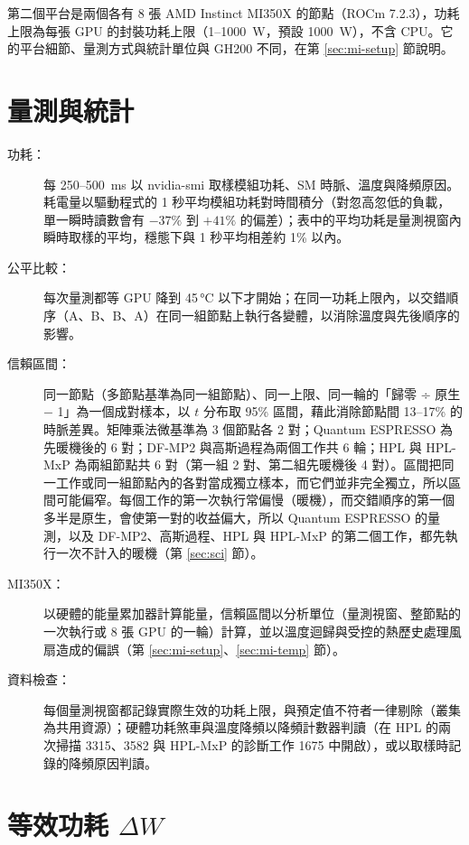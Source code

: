 第二個平台是兩個各有 8 張 AMD Instinct MI350X 的節點（ROCm 7.2.3），功耗上限為每張 GPU 的封裝功耗上限（1–1000~W，預設 1000~W），不含 CPU。它的平台細節、量測方式與統計單位與 GH200 不同，在第 \ref{sec:mi-setup} 節說明。

\section{量測與統計}\label{sec:measure}

\begin{description}
  \item[功耗：] 每 250–500~ms 以 nvidia-smi 取樣模組功耗、SM 時脈、溫度與降頻原因。耗電量以驅動程式的 1 秒平均模組功耗對時間積分（對忽高忽低的負載，單一瞬時讀數會有 $-37\%$ 到 $+41\%$ 的偏差）；表中的平均功耗是量測視窗內瞬時取樣的平均，穩態下與 1 秒平均相差約 1\% 以內。
  \item[公平比較：] 每次量測都等 GPU 降到 45\,°C 以下才開始；在同一功耗上限內，以交錯順序（A、B、B、A）在同一組節點上執行各變體，以消除溫度與先後順序的影響。
  \item[信賴區間：] 同一節點（多節點基準為同一組節點）、同一上限、同一輪的「歸零 ÷ 原生 $-$ 1」為一個成對樣本，以 $t$ 分布取 95\% 區間，藉此消除節點間 13–17\% 的時脈差異。矩陣乘法微基準為 3 個節點各 2 對；Quantum ESPRESSO 為先暖機後的 6 對；DF-MP2 與高斯過程為兩個工作共 6 輪；HPL 與 HPL-MxP 為兩組節點共 6 對（第一組 2 對、第二組先暖機後 4 對）。區間把同一工作或同一組節點內的各對當成獨立樣本，而它們並非完全獨立，所以區間可能偏窄。每個工作的第一次執行常偏慢（暖機），而交錯順序的第一個多半是原生，會使第一對的收益偏大，所以 Quantum ESPRESSO 的量測，以及 DF-MP2、高斯過程、HPL 與 HPL-MxP 的第二個工作，都先執行一次不計入的暖機（第 \ref{sec:sci} 節）。
  \item[MI350X：] 以硬體的能量累加器計算能量，信賴區間以分析單位（量測視窗、整節點的一次執行或 8 張 GPU 的一輪）計算，並以溫度迴歸與受控的熱歷史處理風扇造成的偏誤（第 \ref{sec:mi-setup}、\ref{sec:mi-temp} 節）。
  \item[資料檢查：] 每個量測視窗都記錄實際生效的功耗上限，與預定值不符者一律剔除（叢集為共用資源）；硬體功耗煞車與溫度降頻以降頻計數器判讀（在 HPL 的兩次掃描 3315、3582 與 HPL-MxP 的診斷工作 1675 中開啟），或以取樣時記錄的降頻原因判讀。
\end{description}

\section{等效功耗 \texorpdfstring{$\Delta W$}{ΔW}}\label{sec:dw}

